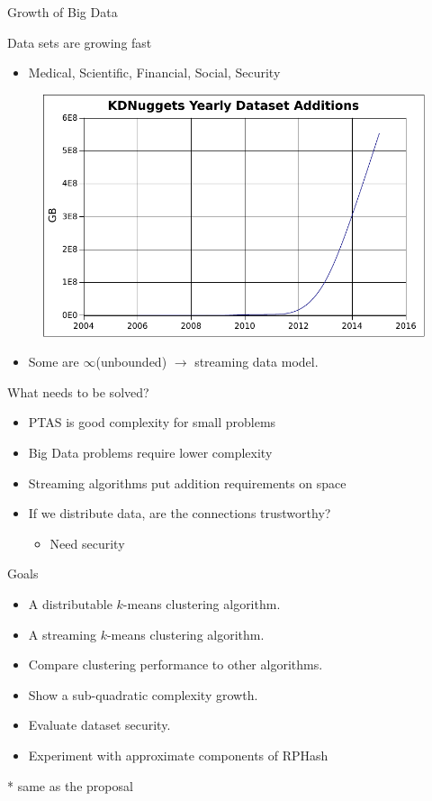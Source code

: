 \documentclass[12pt]{beamer}
\begin{document}
\begin{frame}[plain]{Growth of Big Data}

 Data sets are growing fast
 \begin{itemize}
  \item Medical, Scientific, Financial, Social, Security
 \end{itemize}
  \begin{figure}
 \centerline{\includegraphics[width=.7\textwidth]{figs/datasetsizes}}
\end{figure}
\vspace*{-3\bigskipamount}
\begin{itemize}
 \item Some are $\infty$(unbounded) $\rightarrow$  streaming data model.
\end{itemize}
\end{frame}

\begin{frame}[plain]{What needs to be solved?}
  \begin{itemize}
   \item PTAS is good complexity for small problems
   \item Big Data problems require lower complexity
   \item Streaming algorithms put addition requirements on space
   \item If we distribute data, are the connections trustworthy? 
   \begin{itemize}
    \item Need security
   \end{itemize}
  \end{itemize}
\end{frame}



\begin{frame}[plain]{Goals}
\begin{itemize}
\item A distributable $k$-means clustering algorithm.
\item A streaming $k$-means clustering algorithm.
\item Compare clustering performance to other algorithms.
\item Show a sub-quadratic complexity growth.
\item Evaluate dataset security.
\item Experiment with approximate components of RPHash
\end{itemize}
* same as the proposal
\end{frame}
\end{document}
